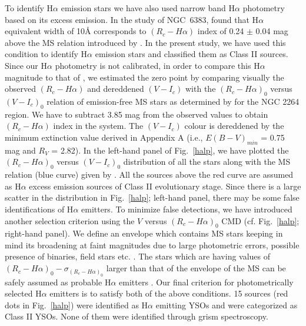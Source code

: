 \documentclass[a4paper,fleqn,usenatbib,useAMS]{mnras}
\begin{document}
To identify H$\alpha$ emission stars we have also used narrow band H$\alpha$ photometry based on its excess emission.
In the study of NGC~6383, \citet{2010AA...511A..25R} found that H$\alpha$ equivalent width of 10\AA 
corresponds to $(R_c-H\alpha)$ index 
of 0.24 $\pm$ 0.04 mag  above the MS relation introduced by \citet{1997AJ....114.2644S}.
In the present study, we have used this condition to identify H$\alpha$ emission stars
and classified them as Class II sources.
Since our H$\alpha$ photometry is not calibrated, in order to compare this H$\alpha$ magnitude to that 
of \citet{1997AJ....114.2644S}, 
we estimated the zero point by comparing visually the observed $(R_c-H\alpha)$ and dereddened $(V - I_c)$ with the $(R_c-H\alpha)_0$
versus $(V - I_c)_0$ relation of emission-free MS stars as determined by \citet{1997AJ....114.2644S}
for the NGC 2264 region. We have to subtract 3.85  mag from the observed values to obtain $(R_c-H\alpha)$
index in the \citet{1997AJ....114.2644S} system. 
The $(V -I_c)$ colour is dereddened by the minimum extinction value derived in Appendix A (i.e., $E(B-V)_{min}$ = 0.75  mag and $R_V$ = 2.82).
In the left-hand panel of Fig.~\ref{halp}, we have plotted the $(R_c-H\alpha)_0$ versus $(V-I_c)_0$ distribution of
all the stars along with the MS relation (blue curve) given by \citet{1997AJ....114.2644S}.
All the sources above the red curve \citep[0.24 mag above the MS relation, cf.,][]{1997AJ....114.2644S} are assumed as H$\alpha$ excess emission sources of Class II evolutionary stage.
Since there is a large scatter in the distribution in Fig.~\ref{halp}; left-hand panel, there may be
some false identifications of H$\alpha$ emitters. To minimize false detections, we have introduced
another selection criterion using the $V$ versus $(R_c-H\alpha)_0$
CMD (cf. Fig.~\ref{halp}; right-hand panel). We define an envelope which
contains MS stars keeping in mind its broadening at faint magnitudes due to large photometric errors,
possible presence of binaries, field stars etc. \citep{1994ApJS...90...31P}.
The stars which are having values of
$(R_c-H\alpha)_0 - \sigma_{(R_c-H\alpha)_0}$  larger than that of the envelope of the MS can be safely assumed as
probable H$\alpha$ emitters \citep{2014A&A...567A.109K}. 
Our final criterion for photometrically selected H$\alpha$ emitters is to satisfy both of the above conditions. 
15 sources  (red dots in  Fig.~\ref{halp}) were identified
as H$\alpha$ emitting YSOs and were categorized as Class II YSOs.
None of them were identified through grism spectroscopy. 
\end{document}
